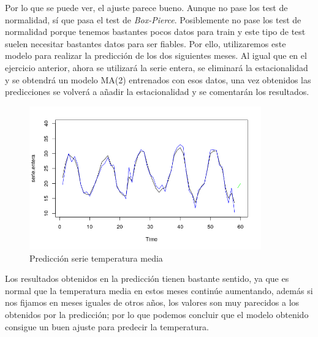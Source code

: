 Por lo que se puede ver, el ajuste parece bueno. Aunque no pase los test de normalidad, sí que pasa el test de \textit{Box-Pierce}. Posiblemente no pase los test de normalidad porque tenemos bastantes pocos datos para train y este tipo de test suelen necesitar bastantes datos para ser fiables. Por ello, utilizaremos este modelo para realizar la predicción de los dos siguientes meses. Al igual que en el ejercicio anterior, ahora se utilizará la serie entera, se eliminará la estacionalidad y se obtendrá un modelo MA(2) entrenados con esos datos, una vez obtenidos las predicciones se volverá a añadir la estacionalidad y se comentarán los resultados.

\begin{figure}[H]
	\centering
	\includegraphics[width=100mm]{imagenes/pred_mean.pdf}
	\caption{Predicción serie temperatura media}
	\label{fig:23}
\end{figure}

Los resultados obtenidos en la predicción tienen bastante sentido, ya que es normal que la temperatura media en estos meses continúe aumentando, además si nos fijamos en meses iguales de otros años, los valores son muy parecidos a los obtenidos por la predicción; por lo que podemos concluir que el modelo obtenido consigue un buen ajuste para predecir la temperatura.
